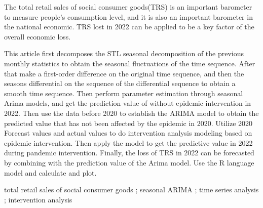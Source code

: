 

{
\setlength{\parindent}{2em}
The total retail sales of social consumer goods(TRS) is an important barometer to measure people's consumption level, and it is also an important barometer in the national economic.
TRS lost in 2022 can be applied to be a key factor of the overall economic loss.

This article first decomposes the STL seasonal decomposition of the previous monthly statistics to obtain the seasonal fluctuations of the time sequence.
After that make a first-order difference on the original time sequence, and then the seasons differential on the sequence of the differential sequence to obtain
a smooth time sequence. Then perform parameter estimation through seasonal Arima models, and
get the prediction value of without epidemic intervention in 2022. Then use the data before 2020 to establish the ARIMA model to obtain the predicted value 
that has not been affected by the epidemic in 2020. Utilize 2020
Forecast values and actual values to do intervention analysis modeling based on epidemic intervention. Then apply the model to get the
predictive value in 2022 during pandemic intervention. Finally, the loss of TRS in 2022 can be forecasted by combining with the prediction value of the Arima model.
Use the R language model and calculate and plot.

total retail sales of social consumer goods ; seasonal ARIMA ;
time series analysis ; intervention analysis


}

